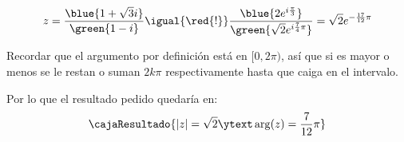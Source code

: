 \begin{enumerate}[label=\roman*)]
\begin{minipage}{0.2\textwidth}
        \end{minipage}
        \begin{minipage}{0.7\textwidth}
          $$
            z = \frac{\blue{1+\sqrt{3}i}}{\green{1 - i}}
            \igual{\red{!}}
            \frac{\blue{2 e^{i \frac{\pi}{3}}}}{\green{\sqrt{2} e^{i\frac{7}{4}\pi}}}
            =
            \sqrt{2}e^{-\frac{17}{12}\pi}
          $$
        \end{minipage}

        Recordar que el argumento por definición está en $[0, 2\pi)$, así que si es mayor o menos se le restan o suman $2k\pi$ respectivamente hasta que
        caiga en el intervalo.

        Por lo que el resultado pedido quedaría en:
        $$
          \cajaResultado{
            |z| = \sqrt{2}
            \ytext
            \arg(z) = \frac{7}{12} \pi
          }
        $$
\end{enumerate}

\begin{aportes}
  \item {}
\end{aportes}
